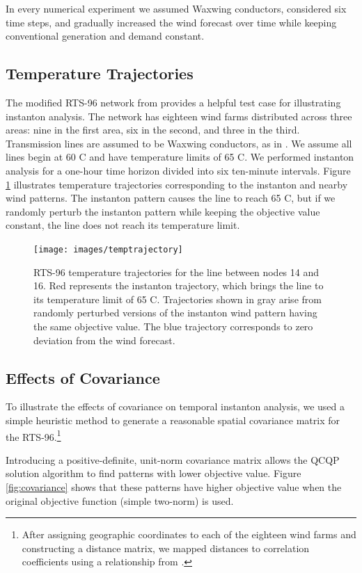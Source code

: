 \documentclass[journal,twoside]{IEEEtran}
\begin{document}
In every numerical experiment we assumed Waxwing conductors, considered six time steps, and gradually increased the wind forecast over time while keeping conventional generation and demand constant.

\subsection{Temperature Trajectories}
The modified RTS-96 network from \cite{pandzic} provides a helpful test case for illustrating instanton analysis. The network has eighteen wind farms distributed across three areas: nine in the first area, six in the second, and three in the third. Transmission lines are assumed to be Waxwing conductors, as in \cite{almassalkhi2015}. We assume all lines begin at 60 C and have temperature limits of 65 C. We performed instanton analysis for a one-hour time horizon divided into six ten-minute intervals. Figure \ref{fig:temptrajectory} illustrates temperature trajectories corresponding to the instanton and nearby wind patterns. The instanton pattern causes the line to reach 65 C, but if we randomly perturb the instanton pattern while keeping the objective value constant, the line does not reach its temperature limit.

\begin{figure}
\centering
\texttt{[image: images/temptrajectory]}
\caption{RTS-96 temperature trajectories for the line between nodes 14 and 16. Red represents the instanton trajectory, which brings the line to its temperature limit of 65 C. Trajectories shown in gray arise from randomly perturbed versions of the instanton wind pattern having the same objective value. The blue trajectory corresponds to zero deviation from the wind forecast.}
\label{fig:temptrajectory}
\end{figure}

\subsection{Effects of Covariance}
To illustrate the effects of covariance on temporal instanton analysis, we used a simple heuristic method to generate a reasonable spatial covariance matrix for the RTS-96.\footnote{After assigning geographic coordinates to each of the eighteen wind farms and constructing a distance matrix, we mapped distances to correlation coefficients using a relationship from \cite{freris2008}.}

Introducing a positive-definite, unit-norm covariance matrix allows the QCQP solution algorithm to find patterns with lower objective value. Figure \ref{fig:covariance} shows that these patterns have higher objective value when the original objective function (simple two-norm) is used.
\end{document}
